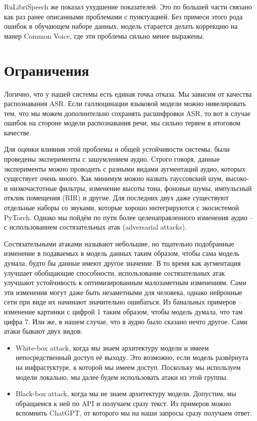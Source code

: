 RuLibriSpeech же показал ухудшение показателей.
Это по большей части связано как раз ранее описанными проблемами с пунктуацией.
Без примеси этого рода ошибок в обучающем наборе данных, модель старается делать коррекцию на манер Common Voice, где эти проблемы сильно менее выражены.

\section{Ограничения}

Логично, что у нашей системы есть единая точка отказа.
Мы зависим от качества распознавания ASR.
Если галлюцинации языковой модели можно нивелировать тем, что мы можем дополнительно сохранять расшифровки ASR, то вот в случае ошибок на стороне модели распознавания речи, мы сильно теряем в итоговом качестве.

Для оценки влияния этой проблемы и общей устойчивости системы, были проведены эксперименты с зашумлением аудио.
Строго говоря, данные эксперименты можно проводить с разными видами аугментаций аудио, которых существует очень много.
Как минимум можно назвать гауссовский шум, высоко- и низкочастотные фильтры, изменение высоты тона, фоновые шумы, импульсный отклик помещения (RIR) и другие.
Для последних двух даже существуют отдельные наборы со звуками, которые хорошо интегрируются с экосистемой PyTorch.
Однако мы пойдём по пути более целенаправленного изменения аудио -- с использованием состязательных атак (adversarial attacks)\cite{olivier2022recent,zhang2022adversarial,carlini2018audio}.

Состязательными атаками называют небольшие, но тщательно подобранные изменение в подаваемых в модель данных таким образом, чтобы сама модель думала, будто бы данные имеют другое значение.
В то время как аугментация улучшает обобщающие способности, использование состязательных атак улучшают устойчивость к оптимизированным малозаметным изменениям.
Сами эти изменения могут даже быть незаметными для человека, однако нейронные сети при виде их начинают значительно ошибаться.
Из банальных примеров -- изменение картинки с цифрой 1 таким образом, чтобы модель думала, что там цифра 7\cite{warr2019strengthening}.
Или же, в нашем случае, что в аудио было сказано нечто другое.
Сами атаки бывают двух видов:

\begin{itemize}
  \item White-box attack, когда мы знаем архитектуру модели и имеем непосредственный доступ её выходу.
  Это возможно, если модель развёрнута на инфрастуктуре, к которой мы имеем доступ.
  Поскольку мы используем модели локально, мы далее будем использовать атаки из этой группы.
  \item Black-box attack, когда мы не знаем архитектуру модели.
  Допустим, мы обращаемся к ней по API и получаем сразу текст.
  Из примеров можно вспомнить ChatGPT, от которого мы на наши запросы сразу получаем ответ.
\end{itemize}

